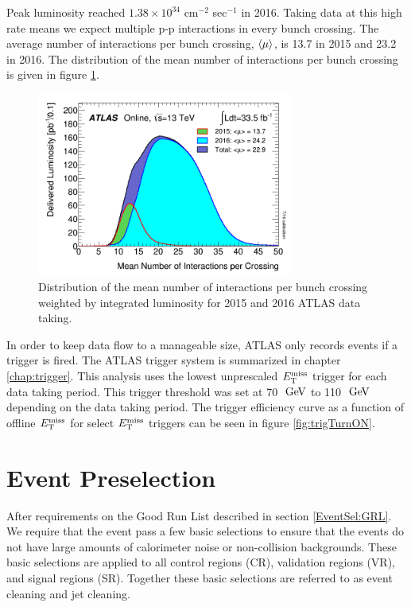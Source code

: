 \indent Peak luminosity reached $1.38 \times 10^{34}$  cm$^{-2}$ sec$^{-1}$ in 2016.  Taking data at this high rate means we expect multiple p-p interactions in every bunch crossing.  The average number of interactions per bunch crossing, $\braket{\mu}$, is 13.7 in 2015 and 23.2 in 2016.  The distribution of the mean number of interactions per bunch crossing is given in figure \ref{fig:nVtx}.   \\

\begin{figure}[htb]
  \begin{center}
    \includegraphics[width=0.75\textwidth]{figures/Data/mu_2015_2016_LHCC.png}\hspace{0.05\textwidth}
\end{center}
\caption{Distribution of the mean number of interactions per bunch crossing weighted by integrated luminosity for 2015 and 2016 ATLAS data taking.    }
\label{fig:nVtx} 
\end{figure}

\indent In order to keep data flow to a manageable size, ATLAS only records events if a trigger is fired.  The ATLAS trigger system is summarized in chapter \ref{chap:trigger}.  This analysis uses the lowest unprescaled $E_{\mathrm{T}}^{\mathrm{miss}}$ trigger for each data taking period.  This trigger threshold was set at 70 $\gev$ to 110 $\gev$ depending on the data taking period. The trigger efficiency curve as a function of offline $E_{\mathrm{T}}^{\mathrm{miss}}$ for select $E_{\mathrm{T}}^{\mathrm{miss}}$ triggers can be seen in figure \ref{fig:trigTurnON}. \\

\chapter{Event Preselection}
\label{chap:Selection_EventPreselection}

\indent After requirements on the Good Run List described in section \ref{EventSel:GRL}.  We require that the event pass a few basic selections to ensure that the events do not have large amounts of calorimeter noise or non-collision backgrounds.  These basic selections are applied to all control regions (CR), validation regions (VR), and signal regions (SR).  Together these basic selections are referred to as event cleaning and jet cleaning.  \\

